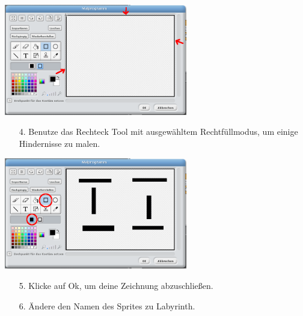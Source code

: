 \includegraphics[width=0.6\textwidth]{images/aufgabe2_rechteck_gross.png}
\begin{itemize}
\item[4.] Benutze das Rechteck Tool mit ausgewähltem Rechtfüllmodus, um einige Hindernisse zu malen.
\end{itemize}
\includegraphics[width=0.6\textwidth]{images/aufgabe2_labyrinth.png}
\begin{itemize}
\item[5.] Klicke auf Ok, um deine Zeichnung abzuschließen.
\item[6.] Ändere den Namen des Sprites zu Labyrinth.
\end{itemize}

